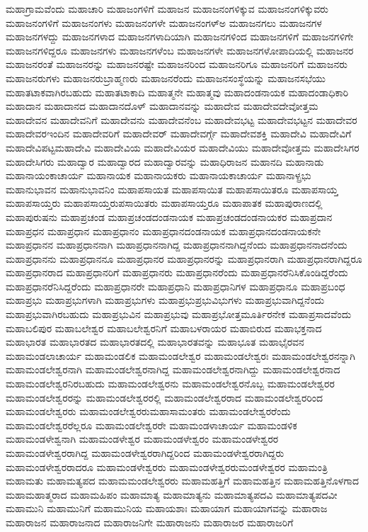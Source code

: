 {ಮಹಾಗ್ರಾಮವೆಂದು
ಮಹಾಚಾರಿ
ಮಹಾಜಂಗಳಿಗೆ
ಮಹಾಜನ
ಮಹಾಜನಂಗಳಿಕ್ಕುವ
ಮಹಾಜನಂಗಳಿಕ್ಕುವರು
ಮಹಾಜನಂಗಳಿಗೆ
ಮಹಾಜನಂಗಳು
ಮಹಾಜನಂಗಳೇ
ಮಹಾಜನಂಗಳ್ಅ
ಮಹಾಜನಗಲು
ಮಹಾಜನಗಳ
ಮಹಾಜನಗಳದ್ದು
ಮಹಾಜನಗಳಾದ
ಮಹಾಜನಗಳಾದಿಯಾಗಿ
ಮಹಾಜನಗಳಿಂದ
ಮಹಾಜನಗಳಿಗೆ
ಮಹಾಜನಗಳಿಗೇ
ಮಹಾಜನಗಳಿದ್ದರೂ
ಮಹಾಜನಗಳು
ಮಹಾಜನಗಳೆಂಬ
ಮಹಾಜನಗಳೇ
ಮಹಾಜನಗಳೋಪಾದಿಯಲ್ಲಿ
ಮಹಾಜನರ
ಮಹಾಜನರಂತೆ
ಮಹಾಜನರನ್ನು
ಮಹಾಜನರಷ್ಟೇ
ಮಹಾಜನರಿಂದ
ಮಹಾಜನರಿಗೂ
ಮಹಾಜನರಿಗೆ
ಮಹಾಜನರು
ಮಹಾಜನರುಗಳು
ಮಹಾಜನರುಬ್ರಾಹ್ಮಣರು
ಮಹಾಜನರೆಂದು
ಮಹಾಜನಸಂಸ್ಥೆಯನ್ನು
ಮಹಾಜನಸಭೆಯು
ಮಹಾತಟಾಕವಾಗಿರಬಹುದು
ಮಹಾತಟಾಕಾದಿ
ಮಹಾತ್ಮನೇ
ಮಹಾತ್ಮವು
ಮಹಾದಂಡನಾಯಕ
ಮಹಾದಂಡಾಧಿಕಾರಿ
ಮಹಾದಾನ
ಮಹಾದಾನದ
ಮಹಾದಾನದೊಳ್
ಮಹಾದಾನವನ್ನು
ಮಹಾದೇವ
ಮಹಾದೇವದೇವೋತ್ತಮ
ಮಹಾದೇವನ
ಮಹಾದೇವನಿಗೆ
ಮಹಾದೇವನು
ಮಹಾದೇವನೆಂಬ
ಮಹಾದೇವಭಟ್ಟ
ಮಹಾದೇವಭಟ್ಟನ
ಮಹಾದೇವರ
ಮಹಾದೇವರಇಂದಿನ
ಮಹಾದೇವರಿಗೆ
ಮಹಾದೇವರ್
ಮಹಾದೇವರ್ಗ್ಗೆ
ಮಹಾದೇವಶಕ್ತಿ
ಮಹಾದೇವಿ
ಮಹಾದೇವಿಗೆ
ಮಹಾದೇವಿಪಟ್ಟಮಹಾದೇವಿ
ಮಹಾದೇವಿಯ
ಮಹಾದೇವಿಯರ
ಮಹಾದೇವಿಯು
ಮಹಾದೇವೋತ್ತಮ
ಮಹಾದೇಸಿಗರ
ಮಹಾದೇಸಿಗರು
ಮಹಾದ್ವಾರ
ಮಹಾದ್ವಾರದ
ಮಹಾದ್ವಾರವನ್ನು
ಮಹಾಧಿರಾಜನ
ಮಹಾನದಿ
ಮಹಾನಾಡು
ಮಹಾನಾಯಂಕಾಚಾರ್ಯ
ಮಹಾನಾಯಕ
ಮಹಾನಾಯಕರು
ಮಹಾನಾಯಕಾಚಾರ್ಯ
ಮಹಾನಾಳ್ಪ್ರಭು
ಮಹಾನುಭಾವನ
ಮಹಾನುಭಾವನಿಂ
ಮಹಾಪಸಾಯತ
ಮಹಾಪಸಾಯಿತ
ಮಹಾಪಸಾಯಿತರೂ
ಮಹಾಪಸಾಯ್ತ
ಮಹಾಪಸಾಯ್ತರು
ಮಹಾಪಸಾಯ್ತರುಪಸಾಯಿತರು
ಮಹಾಪಸಾಯ್ತರೂ
ಮಹಾಪಾತಕ
ಮಹಾಪುರಾಣದಲ್ಲಿ
ಮಹಾಪುರುಷನು
ಮಹಾಪ್ರಚಂಡ
ಮಹಾಪ್ರಚಂಡದಂಡನಾಯಕ
ಮಹಾಪ್ರಚಂಡದಂಡನಾಯಕರ
ಮಹಾಪ್ರದಾನ
ಮಹಾಪ್ರಧನ
ಮಹಾಪ್ರಧಾನ
ಮಹಾಪ್ರಧಾನಂ
ಮಹಾಪ್ರಧಾನದಂಡನಾಯಕ
ಮಹಾಪ್ರಧಾನದಂಡನಾಯಕನೇ
ಮಹಾಪ್ರಧಾನನ
ಮಹಾಪ್ರಧಾನನಾಗಿ
ಮಹಾಪ್ರಧಾನನಾಗಿದ್ದ
ಮಹಾಪ್ರಧಾನನಾಗಿದ್ದನೆಂದು
ಮಹಾಪ್ರಧಾನನಾದನೆಂದು
ಮಹಾಪ್ರಧಾನನು
ಮಹಾಪ್ರಧಾನನೂ
ಮಹಾಪ್ರಧಾನರ
ಮಹಾಪ್ರಧಾನರನ್ನು
ಮಹಾಪ್ರಧಾನರಾಗಿ
ಮಹಾಪ್ರಧಾನರಾಗಿದ್ದರೂ
ಮಹಾಪ್ರಧಾನರಾದ
ಮಹಾಪ್ರಧಾನರಿಗೆ
ಮಹಾಪ್ರಧಾನರು
ಮಹಾಪ್ರಧಾನರೆಂದು
ಮಹಾಪ್ರಧಾನರೆನಿಸಿಕೊಂಡಿದ್ದರೆಂದು
ಮಹಾಪ್ರಧಾನರೆನಿಸಿದ್ದರೆಂದು
ಮಹಾಪ್ರಧಾನರೇ
ಮಹಾಪ್ರಧಾನಿ
ಮಹಾಪ್ರಧಾನಿಗಳ
ಮಹಾಪ್ರಧಾನೂ
ಮಹಾಪ್ರಬಂಧ
ಮಹಾಪ್ರಭು
ಮಹಾಪ್ರಭುಗಳಾಗಿ
ಮಹಾಪ್ರಭುಗಳು
ಮಹಾಪ್ರಭುಪ್ರಭುವಿಭುಗಳು
ಮಹಾಪ್ರಭುವಾಗಿದ್ದನೆಂದು
ಮಹಾಪ್ರಭುವಾಗಿರಬಹುದು
ಮಹಾಪ್ರಭುವಿನ
ಮಹಾಪ್ರಭುವು
ಮಹಾಪ್ರಭೋತ್ತಮೂರ್ತಿರನೇಕ
ಮಹಾಪ್ರಸಾದವೆಂದು
ಮಹಾಬಲಿಪುರ
ಮಹಾಬಲೇಶ್ವರ
ಮಹಾಬಲೇಶ್ವರನಿಗೆ
ಮಹಾಬಳರಾಯರ
ಮಹಾಬಿರುದ
ಮಹಾಭಕ್ತನಾದ
ಮಹಾಭಾರತ
ಮಹಾಭಾರತದ
ಮಹಾಭಾರತದಲ್ಲಿ
ಮಹಾಭಾರತವನ್ನು
ಮಹಾಭೂತ
ಮಹಾಭೈರವನ
ಮಹಾಮಂಡಲಾಚಾರ್ಯ
ಮಹಾಮಂಡಲಿಕ
ಮಹಾಮಂಡಲೇಶ್ವರ
ಮಹಾಮಂಡಲೇಶ್ವರಃ
ಮಹಾಮಂಡಲೇಶ್ವರನನ್ನಾಗಿ
ಮಹಾಮಂಡಲೇಶ್ವರನಾಗಿ
ಮಹಾಮಂಡಲೇಶ್ವರನಾಗಿದ್ದ
ಮಹಾಮಂಡಲೇಶ್ವರನಾಗಿದ್ದು
ಮಹಾಮಂಡಲೇಶ್ವರನಾದ
ಮಹಾಮಂಡಲೇಶ್ವರನಿರಬಹುದು
ಮಹಾಮಂಡಲೇಶ್ವರನು
ಮಹಾಮಂಡಲೇಶ್ವರನೊಬ್ಬ
ಮಹಾಮಂಡಲೇಶ್ವರರ
ಮಹಾಮಂಡಲೇಶ್ವರರನ್ನು
ಮಹಾಮಂಡಲೇಶ್ವರರಲ್ಲಿ
ಮಹಾಮಂಡಲೇಶ್ವರರಾದ
ಮಹಾಮಂಡಲೇಶ್ವರರಿಂದ
ಮಹಾಮಂಡಲೇಶ್ವರರು
ಮಹಾಮಂಡಲೇಶ್ವರರುಮಹಾಸಾಮಂತರು
ಮಹಾಮಂಡಲೇಶ್ವರರೆಂದು
ಮಹಾಮಂಡಲೇಶ್ವರರೆಲ್ಲರೂ
ಮಹಾಮಂಡಲೇಶ್ವರರೇ
ಮಹಾಮಂಡಳಾಚಾರ್ಯ
ಮಹಾಮಂಡಳಿಕ
ಮಹಾಮಂಡಳೇಶ್ವನಾಗಿ
ಮಹಾಮಂಡಳೇಶ್ವರ
ಮಹಾಮಂಡಳೇಶ್ವರಂ
ಮಹಾಮಂಡಳೇಶ್ವರರ
ಮಹಾಮಂಡಳೇಶ್ವರರಾಗಿದ್ದ
ಮಹಾಮಂಡಳೇಶ್ವರರಾಗಿದ್ದರಿಂದ
ಮಹಾಮಂಡಳೇಶ್ವರರಾಗಿದ್ದರು
ಮಹಾಮಂಡಳೇಶ್ವರರಾದರೂ
ಮಹಾಮಂಡಳೇಶ್ವರರು
ಮಹಾಮಂಡಳೇಶ್ವರರುಮಂಡಳೇಶ್ವರರ
ಮಹಾಮಂತ್ರಿ
ಮಹಾಮತು
ಮಹಾಮತ್ಯಪದ
ಮಹಾಮಮಂಡಲೇಶ್ವರರು
ಮಹಾಮಹತ್ತಿಗೆ
ಮಹಾಮಹತ್ತಿನ
ಮಹಾಮಹತ್ತಿನೊಳಗಾದ
ಮಹಾಮಹಾತ್ಮರಾದ
ಮಹಾಮಹಿಪಂ
ಮಹಾಮಾತ್ಯ
ಮಹಾಮಾತ್ಯನು
ಮಹಾಮಾತ್ಯಪದವಿ
ಮಹಾಮಾತ್ಯಪದವೀ
ಮಹಾಮುನಿ
ಮಹಾಮುನಿಗೆ
ಮಹಾಮುನಿಯ
ಮಹಾಯಶಾಃ
ಮಹಾಯಾಗ
ಮಹಾಯಾಗವನ್ನು
ಮಹಾರಾಜ
ಮಹಾರಾಜನ
ಮಹಾರಾಜನಾದ
ಮಹಾರಾಜನಿಗೇ
ಮಹಾರಾಜನು
ಮಹಾರಾಜರ
ಮಹಾರಾಜರಿಗೆ
}
